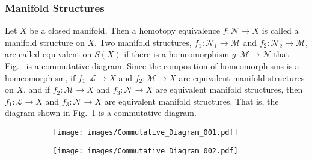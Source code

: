         \subsubsection{Manifold Structures}
            Let $X$ be a closed manifold. Then a homotopy
            equivalence $f:\mathcal{N}\rightarrow{X}$ is called a
            manifold structure on $X$. Two manifold structures,
            $f_{1}:\mathcal{N}_{1}\rightarrow{\mathcal{M}}$ and
            $f_{2}:\mathcal{N}_{2}\rightarrow{\mathcal{M}}$, are called
            equivalent on $S(X)$ if there is a homeomorphism
            $g:\mathcal{M}\rightarrow\mathcal{N}$ that
            Fig.~ is a
            commutative diagram. Since the composition of homeomorphisms
            is a homeomorphism, if $f_{1}:\mathcal{L}\rightarrow{X}$ and
            $f_{2}:\mathcal{M}\rightarrow{X}$ are equivalent manifold structures
            on $X$, and if $f_{2}:\mathcal{M}\rightarrow{X}$
            and $f_{3}:\mathcal{N}\rightarrow{X}$ are equivalent
            manifold structures, then $f_{1}:\mathcal{L}\rightarrow{X}$
            and $f_{3}:\mathcal{N}\rightarrow{X}$ are equivalent manifold
            structures. That is, the diagram shown in
            Fig.~\ref{fig:Equivalent_Manifold_Structure_Diagram} is a
            commutative diagram.
            \begin{figure}[H]
                \captionsetup{type=figure}
                \begin{subfigure}[b]{0.49\textwidth}
                    \centering
                    \captionsetup{type=figure}
                    \texttt{[image: images/Commutative\_Diagram\_001.pdf]}
                    \label{fig:Equivalent_Manifold_Structure_Diagram}
                \end{subfigure}
                \begin{subfigure}[b]{0.49\textwidth}
                    \centering
                    \captionsetup{type=figure}
                    \texttt{[image: images/Commutative\_Diagram\_002.pdf]}
                    \label{fig:Equivalent_Manifold_Structure_%
                           Diagram_Equivalence_Relation}
                \end{subfigure}
                \label{Commutative Diagrams for Manifold Structures.}
                \label{fig:Commutative_Diagrams_for_Manifold_Structures}
            \end{figure}
